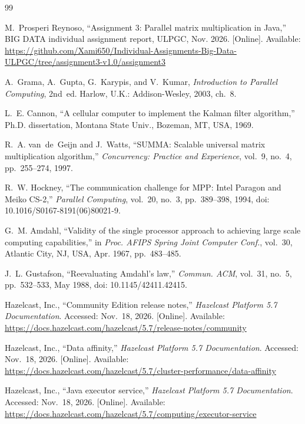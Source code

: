 \documentclass[11pt,a4paper]{article}
\begin{document}
\renewcommand{\refname}{References}
\begin{thebibliography}{99}\raggedright
\small

M.~Prosperi Reynoso, ``Assignment 3: Parallel matrix multiplication in Java,''
BIG DATA individual assignment report, ULPGC, Nov. 2026. [Online]. Available:
\url{https://github.com/Xami650/Individual-Assignments-Big-Data-ULPGC/tree/assignment3-v1.0/assignment3}

A.~Grama, A.~Gupta, G.~Karypis, and V.~Kumar, \emph{Introduction to Parallel
Computing}, 2nd~ed. Harlow, U.K.: Addison-Wesley, 2003, ch.~8.

L.~E. Cannon, ``A cellular computer to implement the Kalman filter
algorithm,'' Ph.D. dissertation, Montana State Univ., Bozeman, MT, USA, 1969.

R.~A. van~de~Geijn and J.~Watts, ``SUMMA: Scalable universal matrix
multiplication algorithm,'' \emph{Concurrency: Practice and Experience},
vol.~9, no.~4, pp.~255--274, 1997.

R.~W. Hockney, ``The communication challenge for MPP: Intel Paragon and Meiko
CS-2,'' \emph{Parallel Computing}, vol.~20, no.~3, pp.~389--398, 1994,
doi: 10.1016/S0167-8191(06)80021-9.

G.~M. Amdahl, ``Validity of the single processor approach to achieving large
scale computing capabilities,'' in \emph{Proc. AFIPS Spring Joint Computer
Conf.}, vol.~30, Atlantic City, NJ, USA, Apr. 1967, pp.~483--485.

J.~L. Gustafson, ``Reevaluating Amdahl's law,'' \emph{Commun. ACM}, vol.~31,
no.~5, pp.~532--533, May 1988, doi: 10.1145/42411.42415.

Hazelcast, Inc., ``Community Edition release notes,'' \emph{Hazelcast Platform
5.7 Documentation}. Accessed: Nov.~18, 2026. [Online]. Available:
\url{https://docs.hazelcast.com/hazelcast/5.7/release-notes/community}

Hazelcast, Inc., ``Data affinity,'' \emph{Hazelcast Platform 5.7
Documentation}. Accessed: Nov.~18, 2026. [Online]. Available:
\url{https://docs.hazelcast.com/hazelcast/5.7/cluster-performance/data-affinity}

Hazelcast, Inc., ``Java executor service,'' \emph{Hazelcast Platform 5.7
Documentation}. Accessed: Nov.~18, 2026. [Online]. Available:
\url{https://docs.hazelcast.com/hazelcast/5.7/computing/executor-service}


\end{thebibliography}
\end{document}
